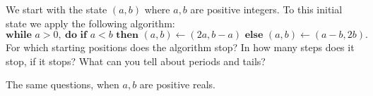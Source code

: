We start with the state $(a, b)$ where $a, b$ are positive integers. To this initial state we apply the following algorithm:
\[ \textbf{while } a > 0,\ \textbf{do if } a < b \textbf{ then } (a, b) \leftarrow (2a, b - a) \textbf{ else } (a, b) \leftarrow (a - b, 2b). \]
For which starting positions does the algorithm stop? In how many steps does it stop, if it stops? What can you tell about periods and tails?

The same questions, when $a, b$ are positive reals.
